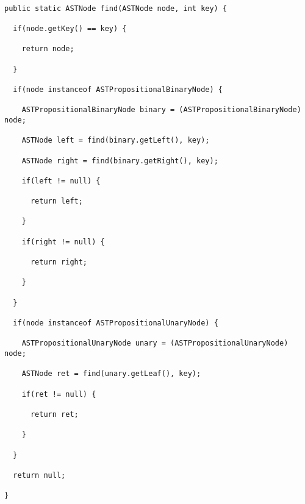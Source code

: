 \documentclass{report}
\begin{document}
\begin{lstlisting}[caption=Find method for equivalences, label=find]

public static ASTNode find(ASTNode node, int key) {

  if(node.getKey() == key) {

    return node;

  }

  if(node instanceof ASTPropositionalBinaryNode) {

    ASTPropositionalBinaryNode binary = (ASTPropositionalBinaryNode) node;

    ASTNode left = find(binary.getLeft(), key);

    ASTNode right = find(binary.getRight(), key);

    if(left != null) {

      return left;

    }

    if(right != null) {

      return right;

    }

  }

  if(node instanceof ASTPropositionalUnaryNode) {

    ASTPropositionalUnaryNode unary = (ASTPropositionalUnaryNode) node;

    ASTNode ret = find(unary.getLeaf(), key);

    if(ret != null) {

      return ret;

    }

  }

  return null;

}

\end{lstlisting}
\end{document}
